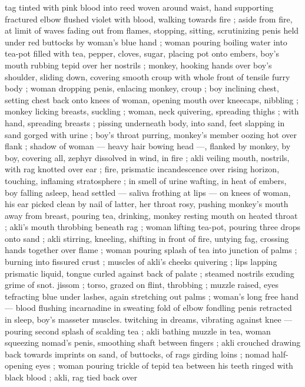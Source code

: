 {tag tinted with pink blood into reed woven around waist, hand 
supporting fractured elbow flushed violet with blood, walking 
towards fire ; aside from fire, at limit of waves fading out from 
flames, stopping, sitting, scrutinizing penis held under red buttocks 
by woman's blue hand ; woman pouring boiling water into tea-pot 
filled with tea, pepper, cloves, sugar, placing pot onto embers, boy's 
mouth rubbing tepid over her nostrils ; monkey, hooking hands over 
boy's shoulder, sliding down, covering smooth croup with whole front 
of tensile furry body ; woman dropping penis, enlacing monkey, 
croup ; boy inclining chest, setting chest back onto knees of woman, 
opening mouth over kneecaps, nibbling ; monkey licking breasts, 
suckling ; woman, neck quivering, spreading thighs ; with hand, 
spreading breasts ; pissing underneath body, into sand, feet 
slapping in sand gorged with urine ; boy's throat purring, monkey's 
member oozing hot over flank ; shadow of woman --- heavy hair 
bowing head ---, flanked by monkey, by boy, covering all, zephyr 
dissolved in wind, in fire ; akli veiling mouth, nostrils, with rag 
knotted over ear ; fire, prismatic incandescence over rising horizon, 
touching, inflaming stratosphere ; in smell of urine wafting, in heat 
of embers, boy falling asleep, head settled --- saliva frothing at lips 
--- on knees of woman, his ear picked clean by nail of latter, her 
throat rosy, pushing monkey's mouth away from breast, pouring tea, 
drinking, monkey resting mouth on heated throat ; akli's mouth 
throbbing beneath rag ; woman lifting tea-pot, pouring three drops 
onto sand ; akli stirring, kneeling, shifting in front of fire, untying 
fag, crossing hands together over flame ; woman pouring splash of 
tea into junction of palms ; burning into fissured crust ; muscles of 
akli's cheeks quivering ; lips lapping prismatic liquid, tongue curled 
against back of palate ; steamed nostrils exuding grime of snot. 
jissom ; torso, grazed on flint, throbbing ; muzzle raised, eyes 
tefracting blue under lashes, again stretching out palms ; woman's 
long free hand --- blood flushing incarnadine in sweating fold of 
elbow fondling penis retracted in sleep, boy's masseter muscles. 
twitching in dreams, vibrating against knee --- pouring second splash 
of scalding tea ; akli bathing muzzle in tea, woman squeezing 
nomad's penis, smoothing shaft between fingers ; akli crouched 
drawing back towards imprints on sand, of buttocks, of rags girding 
loins ; nomad half-opening eyes ; woman pouring trickle of tepid tea 
between his teeth ringed with black blood ; akli, rag tied back over 
}
